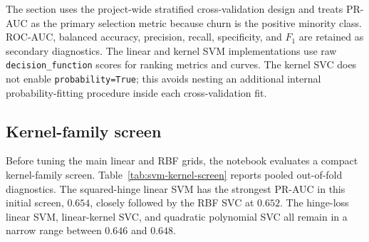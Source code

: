 The section uses the project-wide stratified cross-validation design and treats PR-AUC as the primary selection metric because churn is the positive minority class. ROC-AUC, balanced accuracy, precision, recall, specificity, and \(F_1\) are retained as secondary diagnostics. The linear and kernel SVM implementations use raw \texttt{decision\_function} scores for ranking metrics and curves. The kernel SVC does not enable \texttt{probability=True}; this avoids nesting an additional internal probability-fitting procedure inside each cross-validation fit.

\subsection{Kernel-family screen}

Before tuning the main linear and RBF grids, the notebook evaluates a compact kernel-family screen. Table~\ref{tab:svm-kernel-screen} reports pooled out-of-fold diagnostics. The squared-hinge linear SVM has the strongest PR-AUC in this initial screen, \(0.654\), closely followed by the RBF SVC at \(0.652\). The hinge-loss linear SVM, linear-kernel SVC, and quadratic polynomial SVC all remain in a narrow range between \(0.646\) and \(0.648\).

\begin{table}[H]
\centering
\small
{}
\caption{Kernel-family screen using pooled out-of-fold predictions on the training set}
\label{tab:svm-kernel-screen}
\end{table}

